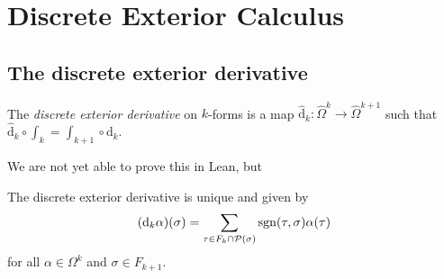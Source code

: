 \section{Discrete Exterior Calculus}

\subsection{The discrete exterior derivative}

\begin{definition}\label{def:discrete_exterior_derivative}
    The \emph{discrete exterior derivative} on $k$-forms is a map $\hat{\mathrm{d}}_k \colon \hat{\Omega}^k \to \hat{\Omega}^{k+1}$ such that $\hat{\mathrm{d}}_k \circ \int_k = \int_{k+1} \circ \mathrm{d}_k$. 
\end{definition}

We are not yet able to prove this in Lean, but 

\begin{theorem}\label{thm:discrete_exterior_derivative_unique}
    The discrete exterior derivative is unique and given by 
    \[ (\mathrm{d}_k \alpha)(\sigma) = \sum_{\tau \in F_k \cap \mathcal{P}(\sigma)} \mathrm{sgn}(\tau,\sigma) \alpha(\tau) \] %
    for all $\alpha \in \Omega^k$ and $\sigma \in F_{k+1}$.
\end{theorem}